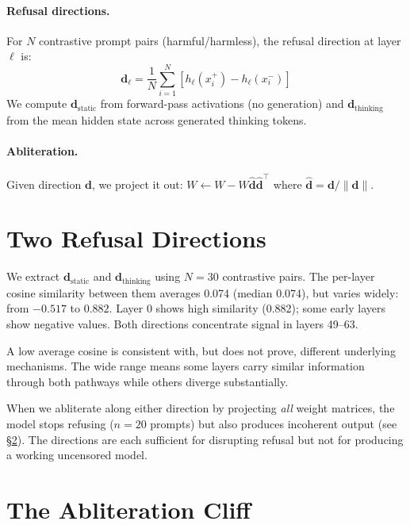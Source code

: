 \documentclass{article}
\begin{document}
\paragraph{Refusal directions.} For $N$ contrastive prompt pairs (harmful/harmless), the refusal direction at layer $\ell$ is:
\begin{equation}
\mathbf{d}_{\ell} = \frac{1}{N} \sum_{i=1}^{N} \left[ h_\ell(x_i^+) - h_\ell(x_i^-) \right]
\end{equation}
We compute $\mathbf{d}_{\text{static}}$ from forward-pass activations (no generation) and $\mathbf{d}_{\text{thinking}}$ from the mean hidden state across generated thinking tokens.

\paragraph{Abliteration.} Given direction $\mathbf{d}$, we project it out: $W \leftarrow W - W \hat{\mathbf{d}} \hat{\mathbf{d}}^\top$ where $\hat{\mathbf{d}} = \mathbf{d} / \|\mathbf{d}\|$.

\section{Two Refusal Directions}
\label{sec:two-directions}

We extract $\mathbf{d}_{\text{static}}$ and $\mathbf{d}_{\text{thinking}}$ using $N = 30$ contrastive pairs. The per-layer cosine similarity between them averages 0.074 (median 0.074), but varies widely: from $-0.517$ to $0.882$. Layer 0 shows high similarity (0.882); some early layers show negative values. Both directions concentrate signal in layers 49--63.

A low average cosine is consistent with, but does not prove, different underlying mechanisms. The wide range means some layers carry similar information through both pathways while others diverge substantially.

When we abliterate along either direction by projecting \emph{all} weight matrices, the model stops refusing ($n = 20$ prompts) but also produces incoherent output (see \S\ref{sec:cliff}). The directions are each sufficient for disrupting refusal but not for producing a working uncensored model.

\section{The Abliteration Cliff}
\label{sec:cliff}
\end{document}
